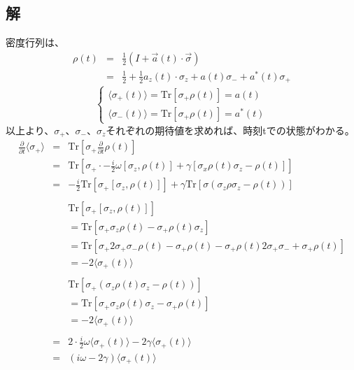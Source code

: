 \documentclass[10pt]{ujarticle}
\begin{document}
\subsection{解}
密度行列は、
\begin{eqnarray*}
  \rho(t) &=& \frac{1}{2} (I+ \vec{a}(t) \cdot \vec{\sigma})\\
  &=& \frac{1}{2} + \frac{1}{2} a_z(t) \cdot \sigma_z + a(t)\sigma_- + a^*(t) \sigma_+
\end{eqnarray*}
\[
\begin{cases}
  \langle \sigma_+(t) \rangle = \mathrm{Tr}[\sigma_+ \rho(t)] = a(t)\\
  \langle \sigma_-(t) \rangle = \mathrm{Tr}[\sigma_+ \rho(t)] = a^*(t)
\end{cases}
\]
以上より、$\sigma_+$、$\sigma_-$、$\sigma_z$それぞれの期待値を求めれば、時刻tでの状態がわかる。
\begin{eqnarray*}
  \frac{\partial}{\partial t} \langle \sigma_+ \rangle &=& \mathrm{Tr} \left[\sigma_+ \frac{\partial}{\partial t} \rho(t) \right] \\
  &=& \mathrm{Tr}\left[\sigma_+ \cdot -\frac{i}{2} \omega[\sigma_z, \rho(t)] + \gamma[\sigma_x \rho(t) \sigma_z - \rho(t)]\right]\\
  &=& - \frac{i}{2} \mathrm{Tr}\left[ \sigma_+ [\sigma_z , \rho(t)] \right] + \gamma \mathrm{Tr}\left[\sigma(\sigma_z \rho \sigma_z - \rho(t))\right]\\
  &&\\
  && \mathrm{Tr} \left[ \sigma_+ \left[ \sigma_z, \rho(t) \right] \right]\\
  && = \mathrm{Tr} \left[ \sigma_+ \sigma_z \rho(t) - \sigma_+ \rho(t) \sigma_z \right]\\
  && = \mathrm{Tr} \left[ \sigma_+ 2\sigma_+ \sigma_- \rho(t) - \sigma_+\rho(t) -\sigma_+\rho(t)2\sigma_+ \sigma_- + \sigma_+ \rho(t) \right] \\
  && = -2 \langle \sigma_+(t) \rangle\\
  &&\\
  && \mathrm{Tr} \left[ \sigma_+ \left( \sigma_z \rho(t) \sigma_z - \rho(t) \right) \right]\\
  && = \mathrm{Tr} \left[\sigma_+ \sigma_z \rho(t) \sigma_z - \sigma_+ \rho(t) \right]\\
  && = -2 \langle \sigma_+(t) \rangle\\
  &&\\    
  &=& 2 \cdot \frac{i}{2} \omega \langle \sigma_+(t) \rangle - 2\gamma\langle\sigma_+(t)\rangle\\
  &=& (i\omega -2 \gamma)\langle \sigma_+(t) \rangle
\end{eqnarray*}
\end{document}

